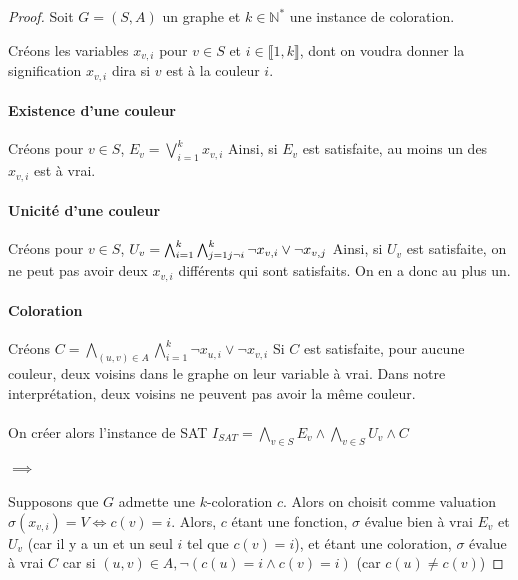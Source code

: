 \begin{proof}
	Soit $G = (S,A)$ un graphe et $k \in \mathbb N^*$ une instance de coloration.
	
	Créons les variables $x_{v,i}$ pour $v \in S$ et $i \in \llbracket1, k \rrbracket$, dont on voudra donner la signification $x_{v,i}$ dira si $v$ est à la couleur $i$.
	
	\paragraph{Existence d'une couleur}
	Créons pour $v \in S$, $E_v = \bigvee\limits_{i = 1}^k x_{v,i}$\newline
	Ainsi, si $E_v$ est satisfaite, au moins un des $x_{v,i}$ est à vrai.
	\paragraph{Unicité d'une couleur}
	Créons pour $v \in S$, $U_v = \bigwedge_{i = 1}^k \bigwedge_{j = 1 \\ j \neg i}^k \neg x_{v, i} \vee \neg x_{v,j} $\newline
	Ainsi, si $U_v$ est satisfaite, on ne peut pas avoir deux $x_{v, i}$ différents qui sont satisfaits. On en a donc au plus un.
	\paragraph{Coloration}
	Créons $C = \bigwedge\limits_{(u,v)\in A} \bigwedge\limits_{i = 1}^k \neg x_{u,i} \vee \neg x_{v,i}$\newline
	Si $C$ est satisfaite, pour aucune couleur, deux voisins dans le graphe on leur variable à vrai. Dans notre interprétation, deux voisins ne peuvent pas avoir la même couleur.
	
	\paragraph{} On créer alors l'instance de SAT $I_{SAT} = \bigwedge\limits_{v\in S} E_v \wedge \bigwedge\limits_{v \in S} U_v \wedge C$
	
	\paragraph{ $\boxed{\implies}$ } Supposons que $G$ admette une $k$-coloration $c$. Alors on choisit comme valuation $\sigma (x_{v,i}) = V \iff c(v) = i$. Alors, $c$ étant une fonction, $\sigma$ évalue bien à vrai $E_v$ et $U_v$ (car il y a un et un seul $i$ tel que $c(v) = i$), et étant une coloration, $\sigma$ évalue à vrai $C$ car si $(u,v)\in A, \neg \left( c(u) = i \wedge c(v) = i \right)$ (car $c(u) \neq c(v)$)
	

\end{proof}

